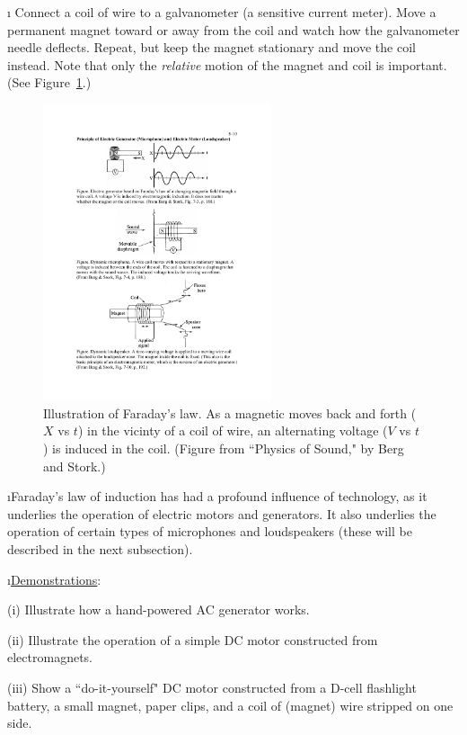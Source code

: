 \i \demo
Connect a coil of wire to a galvanometer (a sensitive current meter).
Move a permanent magnet toward or away from the coil and watch how the
galvanometer needle deflects.
Repeat, but keep the magnet stationary and move the coil instead.
Note that only the {\em relative} motion of the magnet and coil is important.
(See Figure~\ref{f:faraday}.)
%
\begin{figure}[htbp]
\begin{center}
\includegraphics[width=0.6\textwidth]{faraday}
\caption{Illustration of Faraday's law.
As a magnetic moves back and forth ($X$ vs $t$) in the vicinty 
of a coil of wire, an alternating voltage ($V$ vs $t$) is induced
in the coil.
(Figure from ``Physics of Sound," by Berg and Stork.)} 
\label{f:faraday}
\end{center}
\end{figure}
%
 
\i Faraday's law of induction has had a profound influence of 
technology, as it underlies the operation of electric motors and generators.
It also underlies the operation of certain types of microphones and
loudspeakers (these will be described in the next subsection).

\i \underline{Demonstrations}:

(i) Illustrate how a hand-powered AC generator works.

(ii) Illustrate the operation of a simple DC motor constructed
from electromagnets.

(iii) Show a ``do-it-yourself" DC motor constructed from a D-cell
flashlight battery, a small magnet, paper clips, and a coil of (magnet)
wire stripped on one side.


